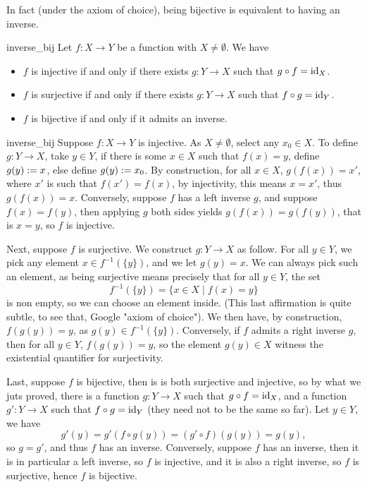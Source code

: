 In fact (under the axiom of choice), being bijective is equivalent to having an inverse.
\begin{cprop}{}{inverse_bij}
    Let \( f : X \to Y \) be a function with \( X \neq \emptyset \). We have
    \begin{itemize}
        \item \( f \) is injective if and only if there exists \( g : Y \to X \) such that \( g \circ f = \mathrm{id}_X \). 
        \item \( f \) is surjective if and only if there exists \( g : Y \to X \) such that \( f \circ g = \mathrm{id}_Y \).
        \item \( f \) is bijective if and only if it admits an inverse. 
    \end{itemize}
\end{cprop}
\begin{propproof}{inverse_bij}
    Suppose \( f : X \to Y \) is injective. As \( X \neq \emptyset \), select any \( x_0 \in X \). To define \( g : Y \to X \), take \( y \in Y \), if there is some \( x \in X \) such that \( f(x) = y \), define \( g(y) := x \), else define \( g(y) := x_0 \). By construction, for all \( x \in X \), \( g(f(x)) = x' \), where \( x' \) is such that \( f(x') = f(x) \), by injectivity, this means \( x = x' \), thus \( g(f(x)) = x \). Conversely, suppose \( f \) has a left inverse \( g \), and suppose \( f(x) = f(y) \), then applying \( g \) both sides yields \( g(f(x)) = g(f(y)) \), that is \( x = y \), so \( f \) is injective.

    Next, suppose \( f \) is surjective. We construct \( g : Y \to X \) as follow. For all \( y \in Y \), we pick any element \( x \in f^{-1}(\{ y \}) \), and we let \( g(y) = x \). We can always pick such an element, as being surjective means precisely that for all \( y \in Y\), the set
    \begin{equation*}
        f^{-1}(\{ y \}) = \{ x \in X \mid f(x) = y \}
    \end{equation*}
    is non empty, so we can choose an element inside. (This last affirmation is quite subtle, to see that, Google "axiom of choice"). We then have, by construction, \( f(g(y)) = y \), as \( g(y) \in f^{-1}(\{ y \}) \). Conversely, if \( f \) admits a right inverse \( g \), then for all \( y \in Y \), \( f(g(y)) = y \), so the element \( g(y) \in X \) witness the existential quantifier for surjectivity.

    Last, suppose \( f \) is bijective, then is is both surjective and injective, so by what we juts proved, there is a function \( g : Y \to X \) such that \( g \circ f = \mathrm{id}_X \), and a function \( g' : Y \to X \) such that \( f \circ g = \mathrm{id}_Y \) (they need not to be the same so far). Let \( y \in Y \), we have
    \begin{equation*}
        g'(y) = g'(f\circ g(y)) = (g' \circ f) (g(y)) = g(y),
    \end{equation*}
    so \( g = g' \), and thus \( f \) has an inverse. Conversely, suppose \( f \) has an inverse, then it is in particular a left inverse, so \( f \) is injective, and it is also a right inverse, so \( f \) is surjective, hence \( f \) is bijective.
\end{propproof}

